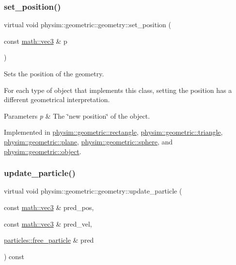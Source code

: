 \subsubsection{\texorpdfstring{set\+\_\+position()}{set\_position()}}
{\footnotesize\ttfamily virtual void physim\+::geometric\+::geometry\+::set\+\_\+position (\begin{DoxyParamCaption}\item[{const \hyperlink{structphysim_1_1math_1_1vec3}{math\+::vec3} \&}]{p }\end{DoxyParamCaption})\hspace{0.3cm}{\ttfamily [pure virtual]}}



Sets the position of the geometry. 

For each type of object that implements this class, setting the position has a different geometrical interpretation. 
\begin{DoxyParams}{Parameters}
{\em p} & The \char`\"{}new position\char`\"{} of the object. \\
\hline
\end{DoxyParams}


Implemented in \hyperlink{classphysim_1_1geometric_1_1rectangle_a7458e8b880ace6a3393a728edb6d66fa}{physim\+::geometric\+::rectangle}, \hyperlink{classphysim_1_1geometric_1_1triangle_a60c60f0260fff5402c546a01e7fb5d5f}{physim\+::geometric\+::triangle}, \hyperlink{classphysim_1_1geometric_1_1plane_a201455ce1b4493b02b2f0c14e7d57e71}{physim\+::geometric\+::plane}, \hyperlink{classphysim_1_1geometric_1_1sphere_ad31c556961c46dbbdf3ade9bd7035d58}{physim\+::geometric\+::sphere}, and \hyperlink{classphysim_1_1geometric_1_1object_ab1efcebf4013206cee817beeb0415cd6}{physim\+::geometric\+::object}.

\mbox{\label{classphysim_1_1geometric_1_1geometry_ae5d606ba51451b964fcb2301d5622cab}} 
\subsubsection{\texorpdfstring{update\+\_\+particle()}{update\_particle()}\hspace{0.1cm}{\footnotesize\ttfamily [1/2]}}
{\footnotesize\ttfamily virtual void physim\+::geometric\+::geometry\+::update\+\_\+particle (\begin{DoxyParamCaption}\item[{const \hyperlink{structphysim_1_1math_1_1vec3}{math\+::vec3} \&}]{pred\+\_\+pos,  }\item[{const \hyperlink{structphysim_1_1math_1_1vec3}{math\+::vec3} \&}]{pred\+\_\+vel,  }\item[{\hyperlink{classphysim_1_1particles_1_1free__particle}{particles\+::free\+\_\+particle} \&}]{pred }\end{DoxyParamCaption}) const\hspace{0.3cm}{\ttfamily [pure virtual]}}



